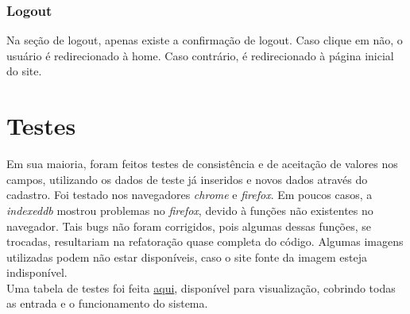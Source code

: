 \documentclass[10pt,a4paper]{article}
\begin{document}
\subsubsection{Logout}
Na seção de logout, apenas existe a confirmação de logout. Caso clique em não, o usuário é redirecionado à home. Caso contrário, é redirecionado à página inicial do site.

\section{Testes}
Em sua maioria, foram feitos testes de consistência e de aceitação de valores nos campos, utilizando os dados de teste já inseridos e novos dados através do cadastro. Foi testado nos navegadores \textit{chrome} e \textit{firefox}. Em poucos casos, a \textit{indexeddb} mostrou problemas no \textit{firefox}, devido à funções não existentes no navegador. Tais bugs não foram corrigidos, pois algumas dessas funções, se trocadas, resultariam na refatoração quase completa do código. Algumas imagens utilizadas podem não estar disponíveis, caso o site fonte da imagem esteja indisponível.\\
Uma tabela de testes foi feita \href{https://docs.google.com/spreadsheets/d/1ymmLQnk6MgIuYaloi86u5KE8QKyGibvhmmrdeVOYmfQ/edit?usp=sharing}{aqui}, disponível para visualização, cobrindo todas as entrada e o funcionamento do sistema.
\end{document}
